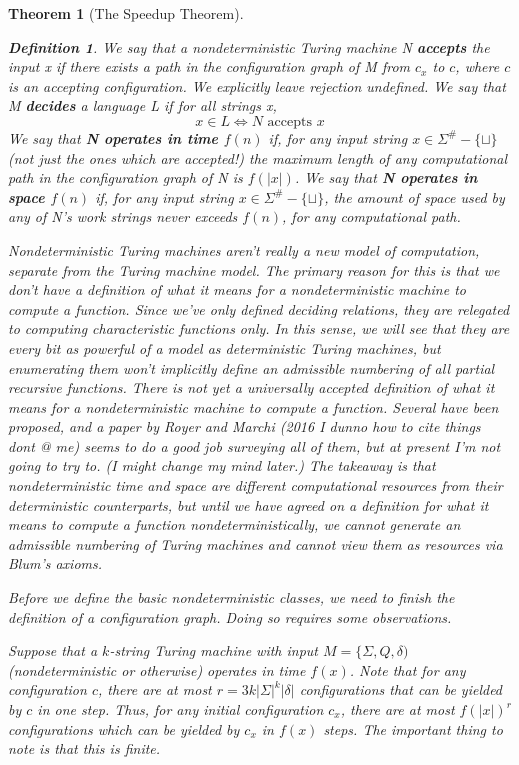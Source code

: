 \documentclass{article}
\theoremstyle{definition}
\newtheorem{definition}{Definition}[section]
\theoremstyle{plain}
\theoremstyle{theorem}
\newtheorem{theorem}{Theorem}[section]
\begin{document}
\begin{theorem}[The Speedup Theorem]
\begin{definition}
We say that a nondeterministic Turing machine N \textbf{accepts} the input x if there exists a path in the configuration graph of M from $c_x$ to $c$, where $c$ is an accepting configuration. \textit{We explicitly leave rejection undefined.} We say that M \textbf{decides} a language L if for all strings x,
\[x \in L \iff N \textrm{ accepts } x\]
We say that \textbf{N operates in time $f(n)$} if, for \textit{any} input string $x \in \Sigma^\#-\{\sqcup\}$ (not just the ones which are accepted!) the maximum length of any computational path in the configuration graph of N is $f(|x|)$. We say that \textbf{N operates in space $f(n)$} if, for any input string $x \in \Sigma^\#-\{\sqcup\}$, the amount of space used by any of N's work strings never exceeds $f(n)$, for any computational path.
\end{definition}
Nondeterministic Turing machines aren't really a new model of computation, separate from the Turing machine model. The primary reason for this is that we don't have a definition of what it means for a nondeterministic machine to compute a function. Since we've only defined deciding relations, they are relegated to computing characteristic functions only. In this sense, we will see that they are every bit as powerful of a model as deterministic Turing machines, but enumerating them won't implicitly define an admissible numbering of \textit{all} partial recursive functions. There is not yet a universally accepted definition of what it means for a nondeterministic machine to compute a function. Several have been proposed, and a paper by Royer and Marchi (2016 I dunno how to cite things dont @ me) seems to do a good job surveying all of them, but at present I'm not going to try to. (I might change my mind later.) The takeaway is that \textit{nondeterministic time and space are different computational resources from their deterministic counterparts}, but until we have agreed on a definition for what it means to compute a function nondeterministically, we cannot generate an admissible numbering of Turing machines and cannot view them as resources via Blum's axioms.
\par Before we define the basic nondeterministic classes, we need to finish the definition of a configuration graph. Doing so requires some observations.
\par Suppose that a $k$-string Turing machine with input $M = \{\Sigma,Q,\delta)$ (nondeterministic or otherwise) operates in time $f(x)$. Note that for any configuration $c$, there are at most $r=3k|\Sigma|^k|\delta|$ configurations that can be yielded by $c$ in one step. Thus, for any initial configuration $c_x$, there are at most $f(|x|)^r$ configurations which can be yielded by $c_x$ in $f(x)$ steps. The important thing to note is that this is finite. 

\end{theorem}
\end{document}
